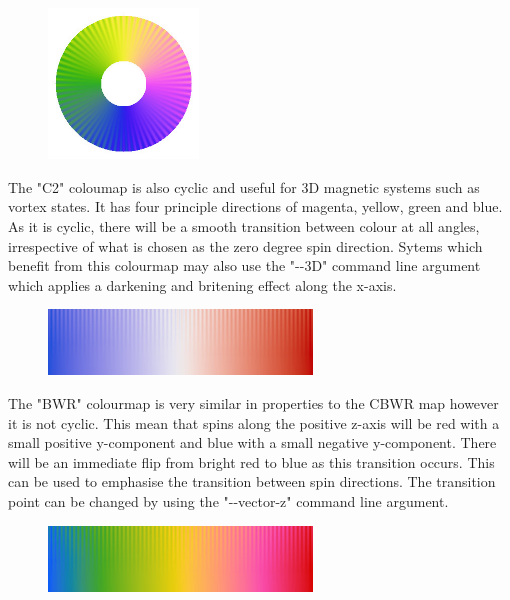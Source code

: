 \begin{figure}[!h]
\center
\includegraphics[width=4cm]{figures/C2_colourmap.jpg}
\label{fig:C2_colourmap}
\end{figure}

The "C2" coloumap is also cyclic and useful for 3D magnetic systems such as vortex states. It has four principle directions of magenta, yellow, green and blue. As it is cyclic, there will be a smooth transition between colour at all angles, irrespective of what is chosen as the zero degree spin direction. Sytems which benefit from this colourmap may also use the "-{}-3D" command line argument which applies a darkening and britening effect along the x-axis. \\

\begin{figure}[!h]
\center
\includegraphics[width=7cm]{figures/BWR_colourmap.jpg}
\label{fig:BWR_colourmap}
\end{figure}

The "BWR" colourmap is very similar in properties to the CBWR map however it is not cyclic. This mean that spins along the positive z-axis will be red with a small positive y-component and blue with a small negative y-component. There will be an immediate flip from bright red to blue as this transition occurs. This can be used to emphasise the transition between spin directions. The transition point can be changed by using the "-{}-vector-z" command line argument. \\

\begin{figure}[!h]
\center
\includegraphics[width=7cm]{figures/Rainbow_colourmap.jpg}
\label{fig:Rainbow_colourmap}
\end{figure}

